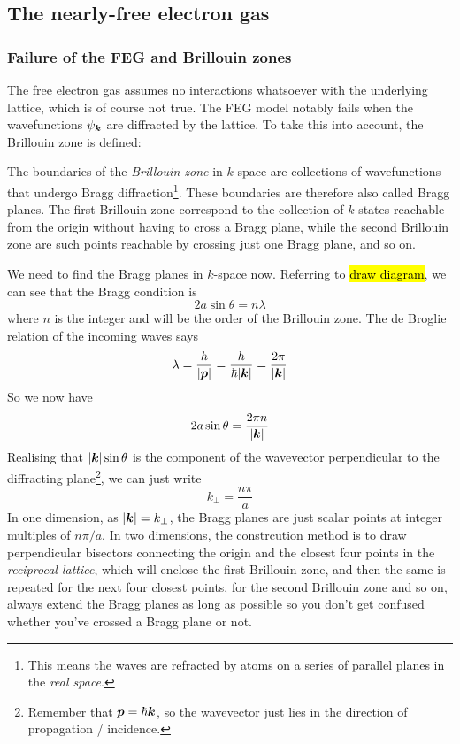\subsection{The nearly-free electron gas}
\subsubsection{Failure of the FEG and Brillouin zones}
The free electron gas assumes no interactions whatsoever with the underlying lattice, which is of course not true. The FEG model notably fails when the wavefunctions $\psi_{\boldsymbol{k}}$ are diffracted by the lattice. To take this into account, the Brillouin zone is defined:
\begin{defi}
The boundaries of the \emph{Brillouin zone} in $k$-space are collections of wavefunctions that undergo Bragg diffraction\footnote{This means the waves are refracted by atoms on a series of parallel planes in the \emph{real space}.}. These boundaries are therefore also called Bragg planes. The first Brillouin zone correspond to the collection of $k$-states reachable from the origin without having to cross a Bragg plane, while the second Brillouin zone are such points reachable by crossing just one Bragg plane, and so on.
\end{defi}
We need to find the Bragg planes in $k$-space now. Referring to \hl{draw diagram}, we can see that the Bragg condition is
\begin{equation}
	2a\sin\theta=n\lambda
\end{equation}
where $n$ is the integer and will be the order of the Brillouin zone. The de Broglie relation of the incoming waves says
\begin{equation}
	\lambda=\frac{h}{|\boldsymbol{p}|}=\frac{h}{\hbar|\boldsymbol{k}|}=\frac{2\pi}{|\boldsymbol{k}|}
\end{equation}
So we now have
\begin{equation}
	2a\sin\theta=\frac{2\pi n}{|\boldsymbol{k} |}
\end{equation}
Realising that $|\boldsymbol{k}|\sin\theta$ is the component of the wavevector perpendicular to the diffracting plane\footnote{Remember that $\boldsymbol{p}=\hbar\boldsymbol{k}$, so the wavevector just lies in the direction of propagation / incidence.}, we can just write
\begin{equation}
	k_{\perp}=\frac{n\pi}{a}
\end{equation}
In one dimension, as $|\boldsymbol{k}|=k_{\perp}$, the Bragg planes are just scalar points at integer multiples of $n\pi/a$. In two dimensions, the constrcution method is to draw perpendicular bisectors connecting the origin and the closest four points in the \emph{reciprocal lattice}, which will enclose the first Brillouin zone, and then the same is repeated for the next four closest points, for the second Brillouin zone and so on, always extend the Bragg planes as long as possible so you don't get confused whether you've crossed a Bragg plane or not.
